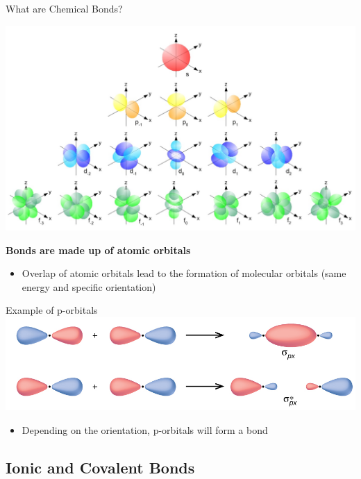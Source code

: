 \documentclass[11pt]{beamer}
\begin{document}
\begin{frame}{What are Chemical Bonds?}
  \begin{center}
    \includegraphics[width=0.8\linewidth]{single_elect_orb}
  \end{center}
  \textbf{Bonds are made up of atomic orbitals}
  \begin{itemize}
  \item Overlap of atomic orbitals lead to the formation of molecular
    orbitals (same energy and specific orientation)
  \end{itemize}
\end{frame}

\begin{frame}{Example of p-orbitals}
  \centering
  \includegraphics[width=\linewidth]{p_sigma}
  \begin{itemize}
  \item Depending on the orientation, p-orbitals
    will form a bond
  \end{itemize}
\end{frame}

\subsection{Ionic and Covalent Bonds}
\end{document}
